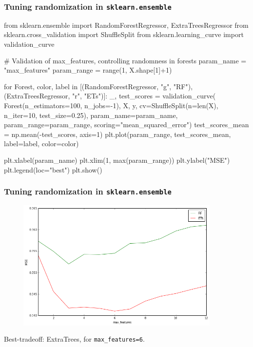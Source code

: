 \documentclass{beamer}
\begin{document}
\begin{frame}[fragile]
\frametitle{Tuning randomization in \texttt{sklearn.ensemble}}

{\scriptsize
\begin{pythoncode}
from sklearn.ensemble import RandomForestRegressor, ExtraTreesRegressor
from sklearn.cross_validation import ShuffleSplit
from sklearn.learning_curve import validation_curve

# Validation of max_features, controlling randomness in forests
param_name = "max_features"
param_range = range(1, X.shape[1]+1)

for Forest, color, label in [(RandomForestRegressor, "g", "RF"),
                             (ExtraTreesRegressor, "r", "ETs")]:
    _, test_scores = validation_curve(
        Forest(n_estimators=100, n_jobs=-1), X, y,
        cv=ShuffleSplit(n=len(X), n_iter=10, test_size=0.25),
        param_name=param_name, param_range=param_range,
        scoring="mean_squared_error")
    test_scores_mean = np.mean(-test_scores, axis=1)
    plt.plot(param_range, test_scores_mean, label=label, color=color)

plt.xlabel(param_name)
plt.xlim(1, max(param_range))
plt.ylabel("MSE")
plt.legend(loc="best")
plt.show()
\end{pythoncode}
}
\end{frame}


\begin{frame}[fragile]
    \frametitle{Tuning randomization in \texttt{sklearn.ensemble}}
    \begin{figure}
        \includegraphics[width=0.9\textwidth]{./figures/randomness.png}
    \end{figure}

    \begin{center}
        Best-tradeoff: ExtraTrees, for \texttt{max\_features=6}.
    \end{center}
\end{frame}
\end{document}
